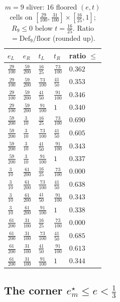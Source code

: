\documentclass[11pt]{amsart}
\newcommand{\Def}{\mathrm{Def}}
\begin{document}
\begin{table}[h]\centering\small
\caption{$m=9$ sliver: $16$ floored $(e,t)$ cells on
$[\tfrac{29}{100},\tfrac{31}{100}]\times[\tfrac{16}{25},1]$; $R_9\le0$ below
$t=\tfrac{16}{25}$.  Ratio $=\Def_9/\text{floor}$ (rounded up).}
\label{zc9:tab:sliver}
\begin{tabular}{lllll}\toprule
$e_L$&$e_R$&$t_L$&$t_R$&ratio $\le$\\\midrule
$\tfrac{29}{100}$&$\tfrac{59}{200}$&$\tfrac{16}{25}$&$\tfrac{73}{100}$&$0.362$\\
$\tfrac{29}{100}$&$\tfrac{59}{200}$&$\tfrac{73}{100}$&$\tfrac{41}{50}$&$0.353$\\
$\tfrac{29}{100}$&$\tfrac{59}{200}$&$\tfrac{41}{50}$&$\tfrac{91}{100}$&$0.346$\\
$\tfrac{29}{100}$&$\tfrac{59}{200}$&$\tfrac{91}{100}$&$1$&$0.340$\\
$\tfrac{59}{200}$&$\tfrac3{10}$&$\tfrac{16}{25}$&$\tfrac{73}{100}$&$0.690$\\
$\tfrac{59}{200}$&$\tfrac3{10}$&$\tfrac{73}{100}$&$\tfrac{41}{50}$&$0.605$\\
$\tfrac{59}{200}$&$\tfrac3{10}$&$\tfrac{41}{50}$&$\tfrac{91}{100}$&$0.343$\\
$\tfrac{59}{200}$&$\tfrac3{10}$&$\tfrac{91}{100}$&$1$&$0.337$\\
$\tfrac3{10}$&$\tfrac{61}{200}$&$\tfrac{16}{25}$&$\tfrac{73}{100}$&$0.000$\\
$\tfrac3{10}$&$\tfrac{61}{200}$&$\tfrac{73}{100}$&$\tfrac{41}{50}$&$0.638$\\
$\tfrac3{10}$&$\tfrac{61}{200}$&$\tfrac{41}{50}$&$\tfrac{91}{100}$&$0.343$\\
$\tfrac3{10}$&$\tfrac{61}{200}$&$\tfrac{91}{100}$&$1$&$0.338$\\
$\tfrac{61}{200}$&$\tfrac{31}{100}$&$\tfrac{16}{25}$&$\tfrac{73}{100}$&$0.000$\\
$\tfrac{61}{200}$&$\tfrac{31}{100}$&$\tfrac{73}{100}$&$\tfrac{41}{50}$&$0.685$\\
$\tfrac{61}{200}$&$\tfrac{31}{100}$&$\tfrac{41}{50}$&$\tfrac{91}{100}$&$0.613$\\
$\tfrac{61}{200}$&$\tfrac{31}{100}$&$\tfrac{91}{100}$&$1$&$0.344$\\
\bottomrule\end{tabular}
\end{table}

\subsection{The corner $e^\star_m\le e<\tfrac13$}\label{zc9:sec:wide}
\end{document}
